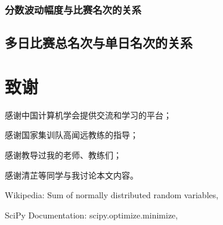         \subsubsection{分数波动幅度与比赛名次的关系}



    \subsection{多日比赛总名次与单日名次的关系}

\section{致谢}

    感谢中国计算机学会提供交流和学习的平台；

    感谢国家集训队高闻远教练的指导；

    感谢教导过我的老师、教练们；

    感谢清芷等同学与我讨论本文内容。

\begin{thebibliography}{9}
    Wikipedia: Sum of normally distributed random variables,\\

    SciPy Documentation: scipy.optimize.minimize,\\
\end{thebibliography}